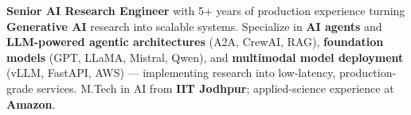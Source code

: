 \documentclass[letter,10pt]{article}
\begin{document}

\textbf{Senior AI Research Engineer} with 5+ years of production experience turning \textbf{Generative AI} research into scalable systems.
Specialize in \textbf{AI agents} and \textbf{LLM-powered agentic architectures} (A2A, CrewAI, RAG), \textbf{foundation models} (GPT, LLaMA, Mistral, Qwen), and \textbf{multimodal model deployment} (vLLM, FastAPI, AWS) — implementing research into low-latency, production-grade services.
M.Tech in AI from \textbf{IIT Jodhpur}; applied-science experience at \textbf{Amazon}.
\end{document}
